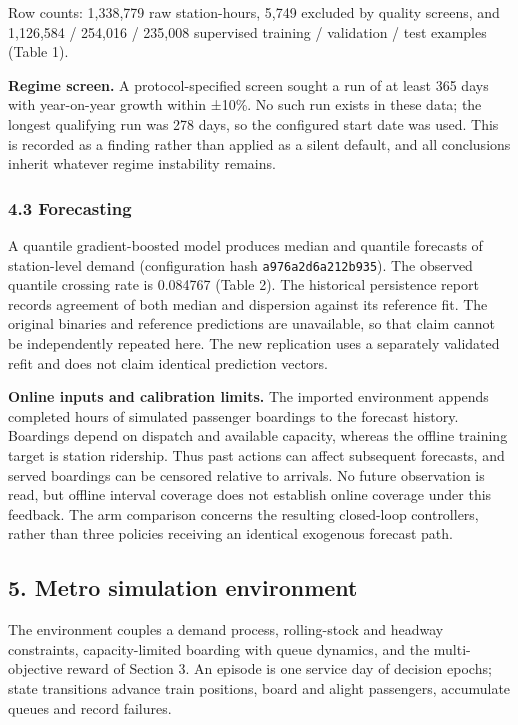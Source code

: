 \documentclass[
]{article}
\begin{document}
Row counts: 1,338,779 raw station-hours, 5,749 excluded by quality
screens, and 1,126,584 / 254,016 / 235,008 supervised training /
validation / test examples (Table 1).

\textbf{Regime screen.} A protocol-specified screen sought a run of at
least 365 days with year-on-year growth within ±10\%. No such run exists
in these data; the longest qualifying run was 278 days, so the
configured start date was used. This is recorded as a finding rather
than applied as a silent default, and all conclusions inherit whatever
regime instability remains.

\subsubsection{4.3 Forecasting}\label{43-forecasting}

A quantile gradient-boosted model produces median and quantile forecasts
of station-level demand (configuration hash \texttt{a976a2d6a212b935}).
The observed quantile crossing rate is 0.084767 (Table 2). The
historical persistence report records agreement of both median and
dispersion against its reference fit. The original binaries and
reference predictions are unavailable, so that claim cannot be
independently repeated here. The new replication uses a separately
validated refit and does not claim identical prediction vectors.

\textbf{Online inputs and calibration limits.} The imported environment
appends completed hours of simulated passenger boardings to the forecast
history. Boardings depend on dispatch and available capacity, whereas
the offline training target is station ridership. Thus past actions can
affect subsequent forecasts, and served boardings can be censored
relative to arrivals. No future observation is read, but offline
interval coverage does not establish online coverage under this
feedback. The arm comparison concerns the resulting closed-loop
controllers, rather than three policies receiving an identical exogenous
forecast path.

\subsection{5. Metro simulation
environment}\label{5-metro-simulation-environment}

The environment couples a demand process, rolling-stock and headway
constraints, capacity-limited boarding with queue dynamics, and the
multi-objective reward of Section 3. An episode is one service day of
decision epochs; state transitions advance train positions, board and
alight passengers, accumulate queues and record failures.
\end{document}
